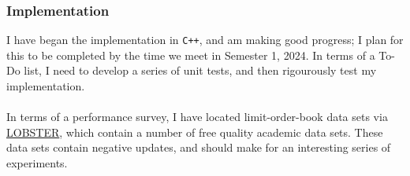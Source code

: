 \documentclass{article}
\begin{document}
\subsubsection*{Implementation}
I have began the implementation in \texttt{C++}, and am making good progress; I plan for this to be completed by the time we meet in Semester 1, 2024. In terms of a To-Do list, I need to develop a series of unit tests, and then rigourously test my implementation. \\
\\
In terms of a performance survey, I have located limit-order-book data sets via \href{https://lobsterdata.com/}{LOBSTER}, which contain a number of free quality academic data sets. These data sets contain negative updates, and should make for an interesting series of experiments. 
\end{document}
